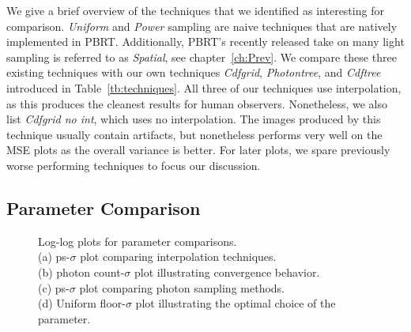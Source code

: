 We give a brief overview of the techniques that we identified as interesting for comparison. \textit{Uniform} and \textit{Power} sampling are naive techniques that are natively implemented in PBRT. Additionally, PBRT's recently released take on many light sampling is referred to as \textit{Spatial}, see chapter~\ref{ch:Prev}. We compare these three existing techniques with our own techniques \textit{Cdfgrid}, \textit{Photontree}, and \textit{Cdftree} introduced in Table~\ref{tb:techniques}. All three of our techniques use interpolation, as this produces the cleanest results for human observers. Nonetheless, we also list \textit{Cdfgrid no int}, which uses no interpolation. The images produced by this technique usually contain artifacts, but nonetheless performs very well on the MSE plots as the overall variance is better. For later plots, we spare previously worse performing techniques to focus our discussion.

\subsection{Parameter Comparison}

\begin{figure}
    \centering
    \begin{subfigure}{.25\textwidth}
      \centering
        \caption{}
        \label{fig:intmain}
    \end{subfigure}%
    \begin{subfigure}{.25\textwidth}
        \caption{}
        \label{fig:pcplot}
    \end{subfigure}%
    \begin{subfigure}{.25\textwidth}
        \caption{}
        \label{fig:unipowplot}
    \end{subfigure}%
    \begin{subfigure}{.25\textwidth}
        \caption{}
        \label{fig:unifloorplot}
    \end{subfigure}
    \caption{Log-log plots for parameter comparisons. \\
    (a) ps-$\sigma$ plot comparing interpolation techniques. \\
    (b) photon count-$\sigma$ plot illustrating convergence behavior. \\
    (c) ps-$\sigma$ plot comparing photon sampling methods. \\
    (d) Uniform floor-$\sigma$ plot illustrating the optimal choice of the parameter.}
    \label{fig:parammain}
\end{figure}

